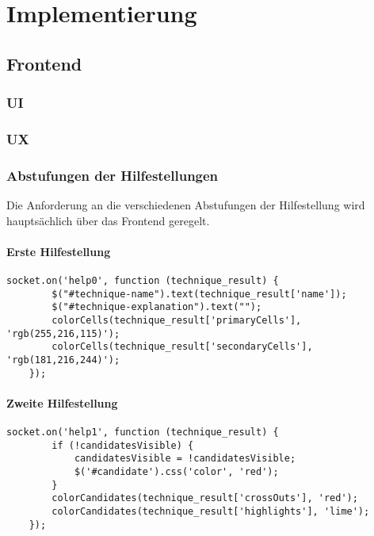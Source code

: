
\part{Implementierung}

\chapter{Frontend}

\section{\ac{UI}}

\section{\ac{UX}}


\section{Abstufungen der Hilfestellungen}
Die Anforderung an die verschiedenen Abstufungen der Hilfestellung wird hauptsächlich über das Frontend geregelt. 

\subsection{Erste Hilfestellung}

\begin{lstlisting}[caption={Erste Hilfestellung}, label={lst:help0}]
	 socket.on('help0', function (technique_result) {
		$("#technique-name").text(technique_result['name']);
		$("#technique-explanation").text("");
		colorCells(technique_result['primaryCells'], 'rgb(255,216,115)');
		colorCells(technique_result['secondaryCells'], 'rgb(181,216,244)');
	});
\end{lstlisting}

\subsection{Zweite Hilfestellung}
\begin{lstlisting}[caption={Zweite Hilfestellung}, label={lst:help1}]
	socket.on('help1', function (technique_result) {
		if (!candidatesVisible) {
			candidatesVisible = !candidatesVisible;
			$('#candidate').css('color', 'red');
		}
		colorCandidates(technique_result['crossOuts'], 'red');
		colorCandidates(technique_result['highlights'], 'lime');
	});
\end{lstlisting}

